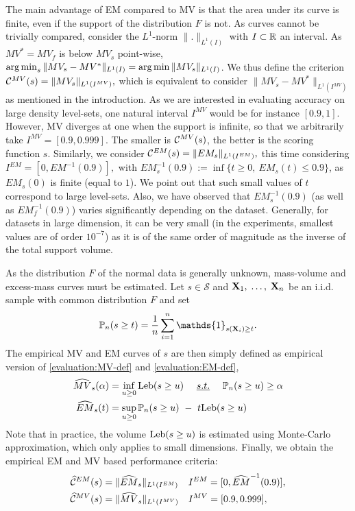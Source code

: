 The main advantage of EM compared to MV is that the area under its curve is finite, even if the support of the distribution $F$ is not.
As curves cannot be trivially compared, consider the $L^1$-norm $\|.\|_{L^1(I)}$ with $I\subset \mathbb{R}$ an interval. As $MV^*=MV_f$ is below $MV_s$ point-wise, $\argmin_s \| MV_s - MV^* \|_{L^1(I)} = \argmin \| MV_s \|_{L^1(I)} $. We thus define the criterion
$\mathcal{C}^{MV}(s) = \| MV_s \|_{L^1(I^{MV})},$ which is equivalent to consider $\| MV_s - MV^* \|_{L^1(I^{MV})}$ as mentioned in the introduction. As we are interested in evaluating accuracy on large density level-sets, one natural interval $I^{MV}$ would be for instance $[0.9, 1]$. However, MV diverges at one when the support is infinite, so that we arbitrarily take $I^{MV} = [0.9, 0.999].$
The smaller is $\mathcal{C}^{MV}(s)$, the better is the scoring function $s$.
%
Similarly, we consider $\mathcal{C}^{EM}(s) = \| EM_s \|_{L^1(I^{EM})}, $ this time considering $I^{EM} = [0,EM^{-1}(0.9)],$ with $EM_s^{-1}(0.9) := \inf\{t\ge 0,~ EM_s(t) \le 0.9\}$, as $EM_s(0)$ is finite (equal to $1$). We point out that such small values of $t$ correspond to large level-sets. Also, we have observed that
$EM_s^{-1}(0.9)$ (as well as $EM_f^{-1}(0.9)$) varies significantly depending on the dataset. Generally, for datasets in large dimension, it can be %
very small (in the experiments, smallest values are of order $10^{-7}$) as it is of the same order of magnitude as the inverse of the total support volume.

As the distribution $F$ of the normal data is generally unknown, mass-volume and excess-mass curves must be estimated. Let $s\in \mathcal{S}$ and $\mathbf X_1,\; \ldots,\; \mathbf X_n$ be an i.i.d. sample with common distribution $F$ and set $$\mathbb{P}_n(s \ge t)=\frac{1}{n}\sum_{i=1}^n\mathds{1}_{s(\mb X_i)\geq t}.$$ The empirical MV and EM curves of $s$ are then simply defined as empirical version of \eqref{evaluation:MV-def} and \eqref{evaluation:EM-def}, 
\begin{align}
\label{evaluation:MV-def-emp}
\widehat{MV}_s(\alpha) &= \inf_{u \ge 0} \text{Leb}(s \ge u) ~~~~\emph{s.t.}{}~~~~ \mathbb{P}_n(s \ge u) \ge \alpha\\
\label{evaluation:EM-def-emp}
\widehat{EM}_s(t) &= \sup_{u \ge 0} \mathbb{P}_n(s \ge u) ~-~ t \text{Leb}(s \ge u)
\end{align}
%
Note that in practice, the volume $\text{Leb}(s \ge u)$ is estimated using Monte-Carlo approximation, which only applies to small dimensions.
%
Finally, we obtain the empirical EM and MV based performance criteria:
\begin{align}
\label{evaluation:eq:standard_emp_EM}\widehat{\mathcal{C}}^{EM}(s) &= \| \widehat{EM}_s \|_{L^1(I^{EM})}  &&I^{EM} = [0,\widehat{EM}^{-1}(0.9)],\\
\label{evaluation:eq:standard_emp_MV}\widehat{\mathcal{C}}^{MV}(s) &= \| \widehat{MV}_s \|_{L^1(I^{MV})}  &&I^{MV} = [0.9, 0.999],
\end{align}

